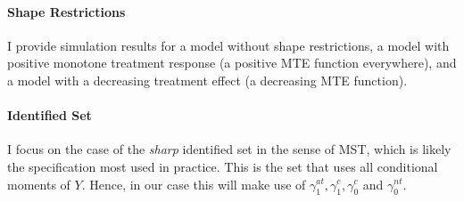 \documentclass[12pt,a4paper,english]{article} %
\numberwithin{equation}{section}
\theoremstyle{definition}
\theoremstyle{remark}
\theoremstyle{plain}
\begin{document}
\paragraph{Shape Restrictions}
I provide simulation results for a model without shape restrictions, a model with positive monotone treatment response (a positive MTE function everywhere), and a model with a decreasing treatment effect (a decreasing MTE function).

\paragraph{Identified Set}
I focus on the case of the \textit{sharp} identified set in the sense of MST, which is likely the specification most used in practice.
This is the set that uses all conditional moments of $Y$.
Hence, in our case this will make use of $\gamma_1^{at}, \gamma_1^{c}, \gamma_0^{c}$ and $\gamma_0^{nt}$.


\end{document}
